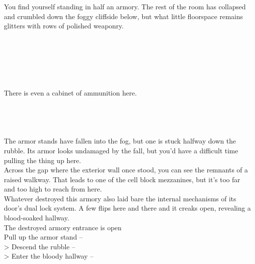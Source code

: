 You find yourself standing in half an armory. The rest of the room has collapsed and crumbled down the foggy cliffside below, but what little floorspace remains glitters with rows of polished weaponry.\\
\\
\\
\\
\\
\\
\\

There is even a cabinet of ammunition here.\\
\\
\\
\\
\\

The armor stands have fallen into the fog, but one is stuck halfway down the rubble. Its armor looks undamaged by the fall, but you’d have a difficult time pulling the thing up here.\\

Across the gap where the exterior wall once stood, you can see the remnants of a raised walkway. That leads to one of the cell block mezzanines, but it's too far and too high to reach from here.\\

Whatever destroyed this armory also laid bare the internal mechanisms of its door's dual lock system. A few flips here and there and it creaks open, revealing a blood-soaked hallway.\\
 The destroyed armory entrance is open\\

 Pull up the armor stand -- \\
> Descend the rubble -- \\
> Enter the bloody hallway -- 